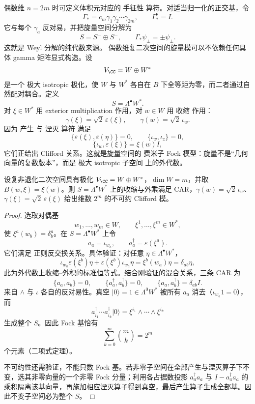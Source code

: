 偶数维 $n=2m$ 时可定义体积元对应的 手征性 算符。对适当归一化的正交基，令
\[
\Gamma_*=c_m\gamma_1\gamma_2\cdots\gamma_{2m},
\qquad
\Gamma_*^2=I.
\]
它与每个 $\gamma_a$ 反对易，并把旋量空间分解为
\[
S=S^+\oplus S^-,
\qquad
\Gamma_*\psi_\pm=\pm\psi_\pm.
\]
这就是 Weyl 分解的纯代数来源。
偶数维复二次空间的旋量模可以不依赖任何具体 gamma 矩阵显式构造。设
\[
V_{\CC}=W\oplus W^*
\]
是一个 极大 isotropic 极化，使 $W$ 与 $W^*$ 各自在 $B$ 下全等距为零，而二者通过自然配对耦合。定义
\begin{equation*}S=\Lambda^\bullet W^*.\end{equation*}
对 $\xi\in W^*$ 用 exterior multiplication 作用，对 $w\in W$ 用 收缩 作用：
\[
\gamma(\xi)=\sqrt2\,\varepsilon(\xi),
\qquad
\gamma(w)=\sqrt2\,\iota_w.
\]
因为 产生 与 湮灭 算符 满足
\[
\{\varepsilon(\xi),\varepsilon(\eta)\}=0,
\qquad
\{\iota_w,\iota_z\}=0,
\]
\[
\{\iota_w,\varepsilon(\xi)\}=\xi(w)I,
\]
它们正给出 Clifford 关系。这就是旋量空间的 费米子 Fock 模型：旋量不是“几何向量的复数版本”，而是 极大 isotropic 子空间 上的外代数。

\begin{proposition}[极化外代数上的不可约旋量模]
设复非退化二次空间具有极化 $V_\CC=W\oplus W^*$，$\dim W=m$，并取 $B(w,\xi)=\xi(w)$。则 $S=\Lambda^\bullet W^*$ 上的收缩与外乘满足 CAR，$\gamma(w)=\sqrt2\,\iota_w$、$\gamma(\xi)=\sqrt2\,\varepsilon(\xi)$ 给出维数 $2^m$ 的不可约 Clifford 模。
\end{proposition}
\begin{proof}
选取对偶基
\[
w_1,\ldots,w_m\in W,
\qquad
\xi^1,\ldots,\xi^m\in W^*,
\]
使 $\xi^a(w_b)=\delta^a_b$。在 $S=\Lambda^\bullet W^*$ 上令
\[
a_a=\iota_{w_a},
\qquad
a_a^\dagger=\varepsilon(\xi^a).
\]
它们满足 正则反交换关系。具体验证：对任意 $\eta\in\Lambda^\bullet W^*$，
\[
\iota_{w_a}\varepsilon(\xi^b)\eta+\varepsilon(\xi^b)\iota_{w_a}\eta
=\xi^b(w_a)\eta=\delta_{ab}\eta,
\]
此为外代数上收缩--外积的标准恒等式。结合刚验证的混合关系，三条 CAR 为
\[
\{a_a,a_b\}=0,
\qquad
\{a_a^\dagger,a_b^\dagger\}=0,
\qquad
\{a_a,a_b^\dagger\}=\delta_{ab}I.
\]
来自 $\wedge$ 与 $\iota$ 各自的反对易性。真空 $|0\rangle=1\in\Lambda^0W^*$ 被所有 $a_a$ 消去（$\iota_{w_a}1=0$），而
\[
a_{i_1}^\dagger\cdots a_{i_k}^\dagger|0\rangle
=\xi^{i_1}\wedge\cdots\wedge\xi^{i_k}
\]
生成整个 $S$。因此 Fock 基恰有
\[
\sum_{k=0}^m\binom mk=2^m
\]
个元素（二项式定理）。

不可约性还需验证，不能只数 Fock 基。若非零子空间在全部产生与湮灭算子下不变，选其非零向量的一个非零 Fock 分量；利用各占据数投影 $a_a^\dagger a_a$ 与 $I-a_a^\dagger a_a$ 的乘积隔离该基向量，再施加相应湮灭算子得到真空，最后产生算子生成全部基。因此不变子空间必为整个 $S$。
\end{proof}


